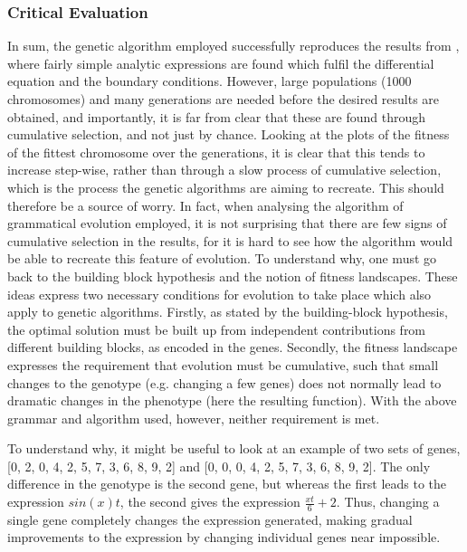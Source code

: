 \documentclass[multicolumn, 12pt]{extarticle}
\begin{document}
\subsubsection{Critical Evaluation}
In sum, the genetic algorithm employed successfully reproduces the results from \cite{Lagaris}, where fairly simple analytic expressions are found which fulfil the differential equation and the boundary conditions. However, large populations (1000 chromosomes) and many generations are needed before the desired results are obtained, and importantly, it is far from clear that these are found through cumulative selection, and not just by chance. Looking at the plots of the fitness of the fittest chromosome over the generations, it is clear that this tends to increase step-wise, rather than through a slow process of cumulative selection, which is the process the genetic algorithms are aiming to recreate. This should therefore be a source of worry. In fact, when analysing the algorithm of grammatical evolution employed, it is not surprising that there are few signs of cumulative selection in the results, for it is hard to see how the algorithm would be able to recreate this feature of evolution. To understand why, one must go back to the building block hypothesis and the notion of fitness landscapes. These ideas express two necessary conditions for evolution to take place which also apply to genetic algorithms. Firstly, as stated by the building-block hypothesis, the optimal solution must be built up from independent contributions from different building blocks, as encoded in the genes. Secondly, the fitness landscape expresses the requirement that evolution must be cumulative, such that small changes to the genotype (e.g. changing a few genes) does not normally lead to dramatic changes in the phenotype (here the resulting function). With the above grammar and algorithm used, however, neither requirement is met.

To understand why, it might be useful to look at an example of two sets of genes, [0, 2, 0, 4, 2, 5, 7, 3, 6, 8, 9, 2] and [0, 0, 0, 4, 2, 5, 7, 3, 6, 8, 9, 2]. The only difference in the genotype is the second gene, but whereas the first leads to the expression $sin(x)t$, the second gives the expression $\frac{xt}{6} + 2$. Thus, changing a single gene completely changes the expression generated, making gradual improvements to the expression by changing individual genes near impossible.
\end{document}
